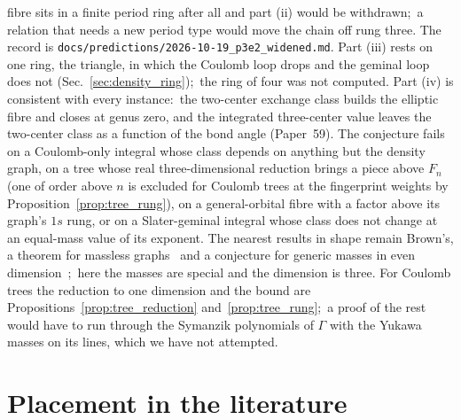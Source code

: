 \documentclass[aps,pra,twocolumn,superscriptaddress,longbibliography]{revtex4-2}
\begin{document}
fibre sits in a finite period ring after all and part (ii) would be
withdrawn;\ a relation that needs a new period type would move the chain off
rung three.  The record is \texttt{docs/predictions/2026-10-19\_p3e2\_widened.md}.
Part (iii) rests on one ring, the triangle, in which the Coulomb loop drops
and the geminal loop does not (Sec.~\ref{sec:density_ring});\ the ring of
four was not computed.  Part (iv) is consistent with every instance:\ the two-center
exchange class builds the elliptic fibre and closes at genus zero, and the
integrated three-center value leaves the two-center class as a function of
the bond angle (Paper~59).  The conjecture fails on a Coulomb-only integral
whose class depends on anything but the density graph, on a tree whose
real three-dimensional reduction brings a piece above $F_n$ (one of order above
$n$ is excluded for Coulomb trees at the fingerprint weights by
Proposition~\ref{prop:tree_rung}), on a
general-orbital fibre with a factor above its graph's $1s$ rung, or on a
Slater-geminal integral whose class does not change at an equal-mass value
of its exponent.  The nearest results in shape remain
Brown's, a theorem for massless graphs~\cite{brown2009periods} and a
conjecture for generic masses in even dimension~\cite{brown2015coaction};\
here the masses are special and the dimension is three.  For Coulomb trees
the reduction to one dimension and the bound are
Propositions~\ref{prop:tree_reduction} and~\ref{prop:tree_rung};\ a proof of
the rest would have to run through the Symanzik polynomials of
$\Gamma$ with the Yukawa masses on its lines, which we have not attempted.

\section{Placement in the literature}
\label{sec:placement}
\end{document}
